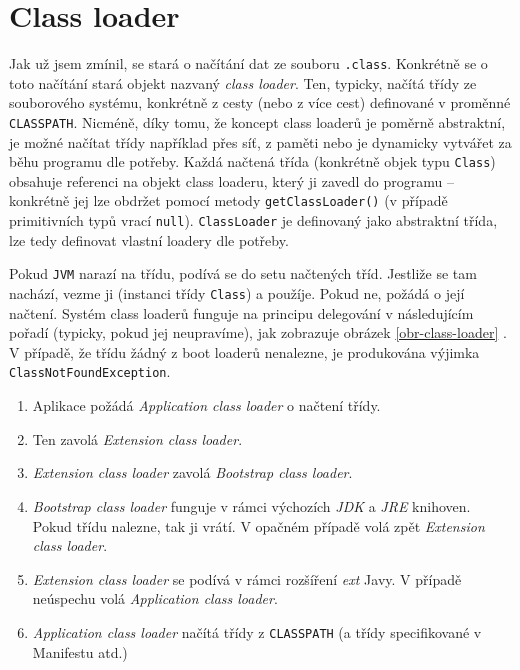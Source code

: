 \section{Class loader}
Jak už jsem zmínil,  se stará o načítání dat ze souboru \texttt{.class}. Konkrétně se o toto načítání stará objekt nazvaný \textit{class loader}. Ten, typicky, načítá třídy ze souborového systému, konkrétně z cesty (nebo z více cest) definované v proměnné \texttt{CLASSPATH}. Nicméně, díky tomu, že koncept class loaderů je poměrně abstraktní, je možné načítat třídy například přes síť, z paměti nebo je dynamicky vytvářet za běhu programu dle potřeby. Každá načtená třída (konkrétně objek typu \texttt{Class}) obsahuje referenci na objekt class loaderu, který ji zavedl do programu -- konkrétně jej lze obdržet pomocí metody \texttt{getClassLoader()} (v případě primitivních typů vrací \texttt{null}). \texttt{ClassLoader} je definovaný jako abstraktní třída, lze tedy definovat vlastní loadery dle potřeby. 

Pokud \texttt{JVM} narazí na třídu, podívá se do setu načtených tříd. Jestliže se tam nachází, vezme ji (instanci třídy \texttt{Class}) a použíje. Pokud ne, požádá o její načtení. Systém class loaderů funguje na principu delegování v následujícím pořadí (typicky, pokud jej neupravíme), jak zobrazuje obrázek \ref{obr-class-loader} \cite{class-loader} \cite{class-loader-hierarchy}. V případě, že třídu žádný z boot loaderů nenalezne, je produkována výjimka \texttt{ClassNotFoundException}. 

\begin{enumerate}
	\item Aplikace požádá \textit{Application class loader} o načtení třídy.
	\item Ten zavolá \textit{Extension class loader}.
	\item \textit{Extension class loader} zavolá \textit{Bootstrap class loader}.
	\item \textit{Bootstrap class loader} funguje v rámci výchozích \textit{JDK} a \textit{JRE} knihoven. Pokud třídu nalezne, tak ji vrátí. V opačném případě volá zpět \textit{Extension class loader}.
	\item \textit{Extension class loader} se podívá v rámci rozšíření \textit{ext} Javy. V případě neúspechu volá \textit{Application class loader}.
	\item \textit{Application class loader} načítá třídy z \texttt{CLASSPATH} (a třídy specifikované v Manifestu atd.)
\end{enumerate}

